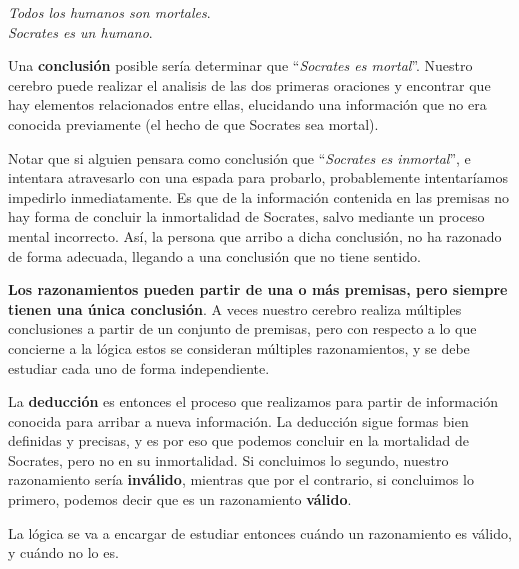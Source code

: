 \begin{example}
    \textit{Todos los humanos son mortales}.\\
    \textit{Socrates es un humano}.
\end{example}

Una \textbf{conclusión} posible sería determinar que ``\textit{Socrates es
mortal}''. Nuestro cerebro puede realizar el analisis de las dos primeras
oraciones y encontrar que hay elementos relacionados entre ellas, elucidando una
información que no era conocida previamente (el hecho de que Socrates sea
mortal).

Notar que si alguien pensara como conclusión que ``\textit{Socrates es
inmortal}'', e intentara atravesarlo con una espada para probarlo, probablemente
intentaríamos impedirlo inmediatamente. Es que de la información contenida en
las premisas no hay forma de concluir la inmortalidad de Socrates, salvo
mediante un proceso mental incorrecto. Así, la persona que arribo a dicha
conclusión, no ha razonado de forma adecuada, llegando a una conclusión que no
tiene sentido.

\textbf{Los razonamientos pueden partir de una o más premisas, pero siempre
tienen una única conclusión}. A veces nuestro cerebro realiza múltiples
conclusiones a partir de un conjunto de premisas, pero con respecto a lo que
concierne a la lógica estos se consideran múltiples razonamientos, y se debe
estudiar cada uno de forma independiente.

La \textbf{deducción} es entonces el proceso que realizamos
para partir de información conocida para arribar a nueva información. La
deducción sigue formas bien definidas y precisas, y es por eso que podemos
concluir en la mortalidad de Socrates, pero no en su inmortalidad. Si concluimos
lo segundo, nuestro razonamiento sería \textbf{inválido}, mientras que por el
contrario, si concluimos lo primero, podemos decir que es un razonamiento
\textbf{válido}.

La lógica se va a encargar de estudiar entonces cuándo un razonamiento es
válido, y cuándo no lo es.

